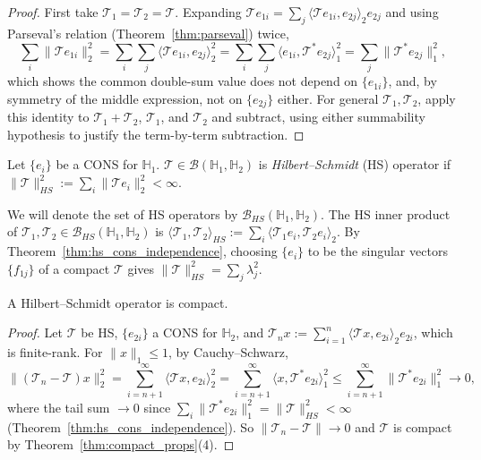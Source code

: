 \begin{proof}
First take $\mathcal{T}_1=\mathcal{T}_2=\mathcal{T}$. Expanding
$\mathcal{T}e_{1i}=\sum_j\langle\mathcal{T}e_{1i},e_{2j}\rangle_2e_{2j}$ and
using Parseval's relation (Theorem~\ref{thm:parseval}) twice,
\[
\sum_i\|\mathcal{T}e_{1i}\|_2^2 = \sum_i\sum_j\langle\mathcal{T}e_{1i},
e_{2j}\rangle_2^2 = \sum_i\sum_j\langle e_{1i},\mathcal{T}^*e_{2j}
\rangle_1^2 = \sum_j\|\mathcal{T}^*e_{2j}\|_1^2,
\]
which shows the common double-sum value does not depend on $\{e_{1i}\}$,
and, by symmetry of the middle expression, not on $\{e_{2j}\}$ either. For
general $\mathcal{T}_1,\mathcal{T}_2$, apply this identity to
$\mathcal{T}_1+\mathcal{T}_2$, $\mathcal{T}_1$, and $\mathcal{T}_2$ and
subtract, using either summability hypothesis to justify the term-by-term
subtraction.
\end{proof}

\begin{definition}
\label{def:hs_operator}
Let $\{e_i\}$ be a CONS for $\mathbb{H}_1$. 
$\mathcal{T}\in\mathcal{B}(\mathbb{H}_1,\mathbb{H}_2)$ is
\emph{Hilbert--Schmidt} (HS) operator if $\|\mathcal{T}\|_{HS}^2 := \sum_i\|\mathcal{T}e_i\|_2^2 <
\infty$. 
\end{definition}
We will denote the set of HS operators by $\mathcal{B}_{HS}(\mathbb{H}_1,\mathbb{H}_2)$.
The HS inner product of $\mathcal{T}_1,\mathcal{T}_2\in
\mathcal{B}_{HS}(\mathbb{H}_1,\mathbb{H}_2)$ is $\langle\mathcal{T}_1,
\mathcal{T}_2\rangle_{HS} := \sum_i\langle\mathcal{T}_1e_i,\mathcal{T}_2e_i
\rangle_2$. By Theorem~\ref{thm:hs_cons_independence}, choosing $\{e_i\}$
to be the singular vectors $\{f_{1j}\}$ of a compact $\mathcal{T}$ gives
$\|\mathcal{T}\|_{HS}^2 = \sum_j\lambda_j^2$.

\begin{theorem}
\label{thm:hs_compact}
A Hilbert--Schmidt operator is compact.
\end{theorem}

\begin{proof}
Let $\mathcal{T}$ be HS, $\{e_{2i}\}$ a CONS for $\mathbb{H}_2$, and
$\mathcal{T}_nx:=\sum_{i=1}^n\langle\mathcal{T}x,e_{2i}\rangle_2e_{2i}$,
which is finite-rank. For $\|x\|_1\leq 1$, by Cauchy--Schwarz,
\[
\|(\mathcal{T}_n-\mathcal{T})x\|_2^2 = \sum_{i=n+1}^\infty\langle
\mathcal{T}x,e_{2i}\rangle_2^2 = \sum_{i=n+1}^\infty\langle x,\mathcal{T}^*
e_{2i}\rangle_1^2 \leq \sum_{i=n+1}^\infty\|\mathcal{T}^*e_{2i}\|_1^2 \to 0,
\]
where the tail sum $\to 0$ since $\sum_i\|\mathcal{T}^*e_{2i}\|_1^2 =
\|\mathcal{T}\|_{HS}^2<\infty$ (Theorem~\ref{thm:hs_cons_independence}).
So $\|\mathcal{T}_n-\mathcal{T}\|\to 0$ and $\mathcal{T}$ is compact by
Theorem~\ref{thm:compact_props}(4).
\end{proof}

